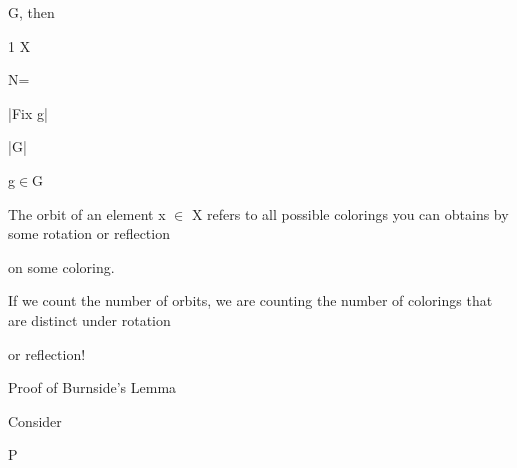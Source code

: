 \documentclass[a4paper,portrait,12pt]{article}
\begin{document}
\begin{flushleft}
G, then
\end{flushleft}


\begin{flushleft}
1 X
\end{flushleft}


\begin{flushleft}
N=
\end{flushleft}


\begin{flushleft}
|Fix g|
\end{flushleft}


\begin{flushleft}
|G|
\end{flushleft}


\begin{flushleft}
g$\in$G
\end{flushleft}





\begin{flushleft}
The orbit of an element x $\in$ X refers to all possible colorings you can obtains by some rotation or reflection
\end{flushleft}


\begin{flushleft}
on some coloring.
\end{flushleft}


\begin{flushleft}
If we count the number of orbits, we are counting the number of colorings that are distinct under rotation
\end{flushleft}


\begin{flushleft}
or reflection!
\end{flushleft}





\begin{flushleft}
Proof of Burnside's Lemma
\end{flushleft}


\begin{flushleft}
Consider
\end{flushleft}





\begin{flushleft}
P
\end{flushleft}
\end{document}
